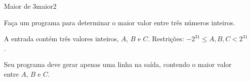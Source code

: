\documentclass[12pt,a4paper,oneside]{article}
\begin{document}
\begin{problem}{Maior de 3}{maior}{2}
 
Faça um programa para determinar o maior valor entre três números inteiros.
%

\InputFile

A entrada contém três valores inteiros, $A$, $B$ e $C$. Restrições: $-2^{31} \leq A,B,C < 2^{31}$.



\OutputFile

Seu programa deve gerar apenas uma linha na saída, contendo o maior valor entre $A$, $B$ e $C$.

\Example

\begin{example}
%
\end{example}

\begin{example}
%
\end{example}

\begin{example}
%
\end{example}

\begin{example}
%
\end{example}



\end{problem}
\end{document}
